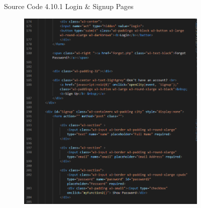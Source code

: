 \begin{enumerate}[1.]
\begin{figure}[h]
\begin{subfigure}[b]{0.7\textwidth}
            \label{fig:sub2}
        \end{subfigure}
        \caption*{Source Code 4.10.1 Login \& Signup Pages}
        \label{fig:myfig49a}
    \end{figure}
    \begin{figure}[h]\ContinuedFloat
        \centering
        \begin{subfigure}[b]{0.7\textwidth}
            \centering
            \includegraphics[width=\textwidth]{mainmatter/images/frontend/code/loginsignup3.png}
            \label{fig:sub3}
        \end{subfigure}
        \hspace{0.05\textwidth}
        \begin{subfigure}[b]{0.7\textwidth}
            \centering

\end{subfigure}
\end{figure}
\end{enumerate}
